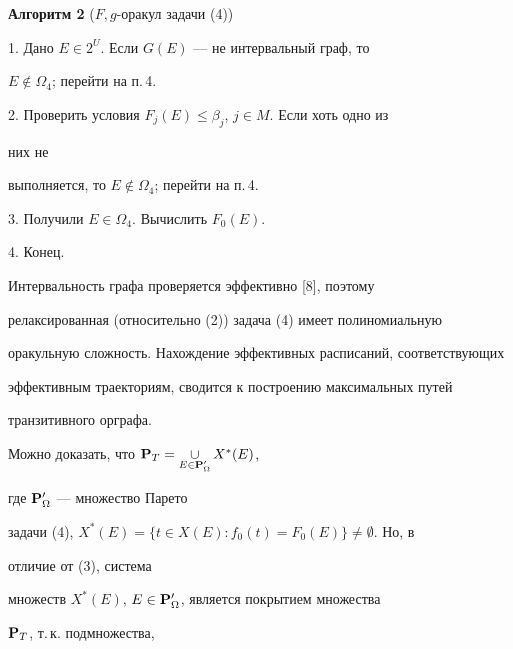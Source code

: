  


\begin{center} 


{\bf Алгоритм 2} ($F,g$-оракул задачи (4))


\end{center} 


 


1. Дано $E\in2^U$. Если $G(E)$ --- не интервальный граф, то 


$E\notin\Omega_4$; перейти на п.\,4. 


 


2. Проверить условия $F_j(E)\le\beta_j$, $j\in M$. Если хоть одно из 


них не 


выполняется, то $E\notin\Omega_4$; перейти на п.\,4. 


 


3. Получили $E\in\Omega_4$. Вычислить $F_0(E)$. 


 


4. Конец. 




 


 


Интервальность графа проверяется эффективно [8], поэтому 


релаксированная (относительно (2)) задача (4) имеет полиномиальную 


оракульную сложность. Нахождение эффективных расписаний, соответствующих 


эффективным траекториям, сводится к построению максимальных путей 


транзитивного орграфа. 


 


Можно доказать, что $\bold P_T=\mathop{\cup}\limits_{E\in\bold 


P'_\Omega}X^*(E)$, 


где $\bold P'_\Omega$ --- множество Парето 


задачи (4), $X^*(E)=\{t\in X(E):f_0(t)=F_0(E)\}\ne\emptyset$. Но, в 


отличие от (3), система 


множеств $X^*(E)$, $E\in\bold P'_\Omega$, является покрытием множества 


$\bold P_T$, т.\,к. подмножества, 


